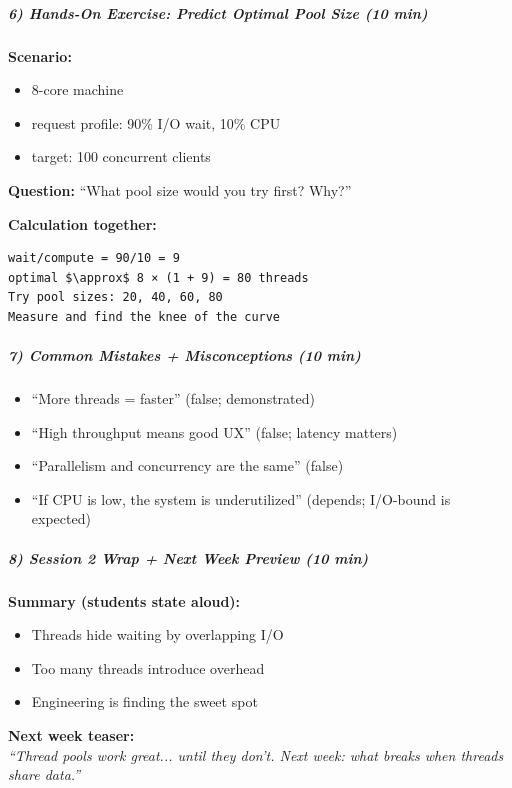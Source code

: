 \documentclass[11pt,a4paper]{article}
\begin{document}
\subparagraph{6) Hands-On Exercise: Predict Optimal Pool Size (10 min)}

\textbf{Scenario:}
\begin{itemize}[leftmargin=*]
\item 8-core machine
\item request profile: 90\% I/O wait, 10\% CPU
\item target: 100 concurrent clients
\end{itemize}

\textbf{Question:} ``What pool size would you try first? Why?''

\textbf{Calculation together:}
\begin{verbatim}
wait/compute = 90/10 = 9
optimal $\approx$ 8 × (1 + 9) = 80 threads
Try pool sizes: 20, 40, 60, 80
Measure and find the knee of the curve
\end{verbatim}

\subparagraph{7) Common Mistakes + Misconceptions (10 min)}

\begin{itemize}[leftmargin=*]
\item ``More threads = faster'' (false; demonstrated)
\item ``High throughput means good UX'' (false; latency matters)
\item ``Parallelism and concurrency are the same'' (false)
\item ``If CPU is low, the system is underutilized'' (depends; I/O-bound is expected)
\end{itemize}

\subparagraph{8) Session 2 Wrap + Next Week Preview (10 min)}

\textbf{Summary (students state aloud):}
\begin{itemize}[leftmargin=*]
\item Threads hide waiting by overlapping I/O
\item Too many threads introduce overhead
\item Engineering is finding the sweet spot
\end{itemize}

\textbf{Next week teaser:}\\
\textit{``Thread pools work great... until they don't. Next week: what breaks when threads share data.''}
\end{document}

